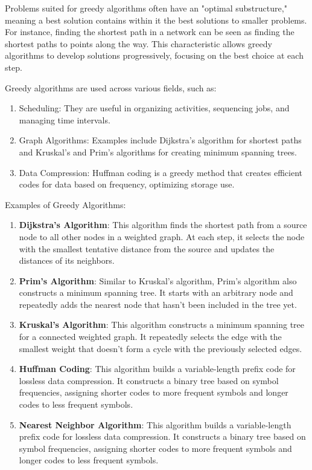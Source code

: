\documentclass[
]{article}
\begin{document}
Problems suited for greedy algorithms often have an "optimal substructure," meaning a best solution contains within it the best solutions to smaller problems. For instance, finding the shortest path in a network can be seen as finding the shortest paths to points along the way. This characteristic allows greedy algorithms to develop solutions progressively, focusing on the best choice at each step.

Greedy algorithms are used across various fields, such as:
\begin{enumerate}
  \item Scheduling: They are useful in organizing activities, sequencing jobs, and managing time intervals.
  \item Graph Algorithms: Examples include Dijkstra's algorithm for shortest paths and Kruskal's and Prim's algorithms for creating minimum spanning trees.
  \item Data Compression: Huffman coding is a greedy method that creates efficient codes for data based on frequency, optimizing storage use. 
\end{enumerate}

  Examples of Greedy Algorithms:
  \begin{enumerate}
    \item \textbf{Dijkstra's Algorithm}: This algorithm finds the shortest path from a source node to all other nodes in a weighted graph. At each step, it selects the node with the smallest tentative distance from the source and updates the distances of its neighbors.
    \item \textbf{Prim's Algorithm}: Similar to Kruskal's algorithm, Prim's algorithm also constructs a minimum spanning tree. It starts with an arbitrary node and repeatedly adds the nearest node that hasn't been included in the tree yet.
    \item \textbf{Kruskal's Algorithm}: This algorithm constructs a minimum spanning tree for a connected weighted graph. It repeatedly selects the edge with the smallest weight that doesn't form a cycle with the previously selected edges.
    \item \textbf{Huffman Coding}: This algorithm builds a variable-length prefix code for lossless data compression. It constructs a binary tree based on symbol frequencies, assigning shorter codes to more frequent symbols and longer codes to less frequent symbols.
    \item \textbf{Nearest Neighbor Algorithm}: This algorithm builds a variable-length prefix code for lossless data compression. It constructs a binary tree based on symbol frequencies, assigning shorter codes to more frequent symbols and longer codes to less frequent symbols.
    
  \end{enumerate}
\end{document}
